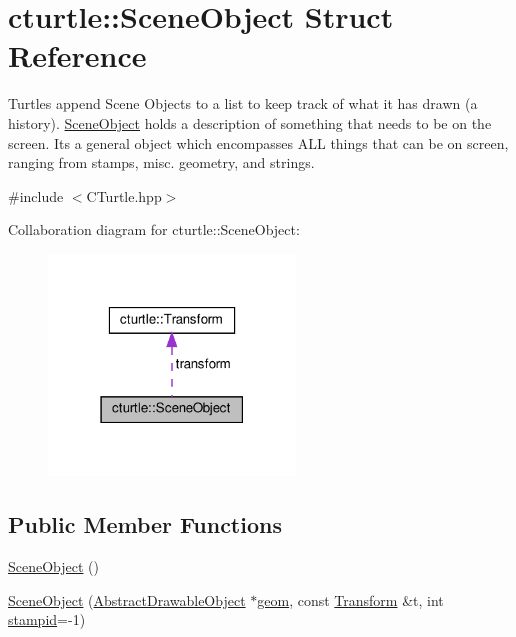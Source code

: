 \hypertarget{structcturtle_1_1SceneObject}{}\section{cturtle\+:\+:Scene\+Object Struct Reference}
\label{structcturtle_1_1SceneObject}


Turtles append Scene Objects to a list to keep track of what it has drawn (a history). \hyperlink{structcturtle_1_1SceneObject}{Scene\+Object} holds a description of something that needs to be on the screen. It\textquotesingle{}s a general object which encompasses A\+LL things that can be on screen, ranging from stamps, misc. geometry, and strings.  




{\ttfamily \#include $<$C\+Turtle.\+hpp$>$}



Collaboration diagram for cturtle\+:\+:Scene\+Object\+:
\nopagebreak
\begin{figure}[H]
\begin{center}
\leavevmode
\includegraphics[width=186pt]{structcturtle_1_1SceneObject__coll__graph}
\end{center}
\end{figure}
\subsection*{Public Member Functions}
\begin{DoxyCompactItemize}
\item 
\hyperlink{structcturtle_1_1SceneObject_ac51b04f4e0509e37a7acce739e608e49}{Scene\+Object} ()
\item 
\hyperlink{structcturtle_1_1SceneObject_a278686eef9384bed5d891065a3a02619}{Scene\+Object} (\hyperlink{classcturtle_1_1AbstractDrawableObject}{Abstract\+Drawable\+Object} $\ast$\hyperlink{structcturtle_1_1SceneObject_a1db44363183fd197b232d5f6e4b89b5c}{geom}, const \hyperlink{classcturtle_1_1Transform}{Transform} \&t, int \hyperlink{structcturtle_1_1SceneObject_ae6094918613e5d4d284805cd5afb2e65}{stampid}=-\/1)
\end{DoxyCompactItemize}
